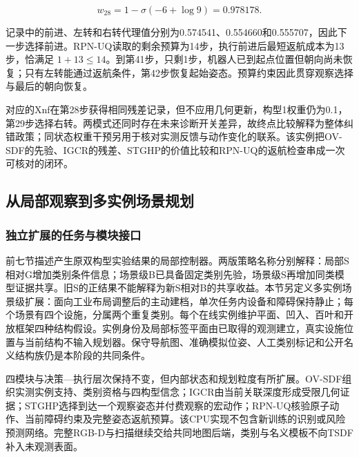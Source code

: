 \documentclass[11pt,a4paper]{article}
\numberwithin{equation}{section}
\begin{document}
\begin{equation}
w_{28}=1-\sigma(-6+\log9)=0.978178.
\end{equation}

记录中的前进、左转和右转代理值分别为0.574541、0.554660和0.555707，因此下一步选择前进。RPN-UQ读取的剩余预算为14步，执行前进后最短返航成本为13步，恰满足 \(1+13\le14\)。到第41步，只剩1步，机器人已到起点位置但朝向尚未恢复；只有左转能通过返航条件，第42步恢复起始姿态。预算约束因此贯穿观察选择与最后的朝向恢复。

对应的Xnf在第28步获得相同残差记录，但不应用几何更新，构型1权重仍为0.1，第29步选择右转。两模式还同时存在未来诊断开关差异，故终点比较解释为整体纠错政策；同状态权重干预另用于核对实测反馈与动作变化的联系。该实例把OV-SDF的先验、IGCR的残差、STGHP的价值比较和RPN-UQ的返航检查串成一次可核对的闭环。

\hypertarget{ux4eceux5c40ux90e8ux89c2ux5bdfux5230ux591aux5b9eux4f8bux573aux666fux89c4ux5212}{%
\subsection{从局部观察到多实例场景规划}\label{ux4eceux5c40ux90e8ux89c2ux5bdfux5230ux591aux5b9eux4f8bux573aux666fux89c4ux5212}}

\hypertarget{ux72ecux7acbux6269ux5c55ux7684ux4efbux52a1ux4e0eux6a21ux5757ux63a5ux53e3}{%
\subsubsection{独立扩展的任务与模块接口}\label{ux72ecux7acbux6269ux5c55ux7684ux4efbux52a1ux4e0eux6a21ux5757ux63a5ux53e3}}

前七节描述产生原双构型实验结果的局部控制器。两版策略名称分别解释：局部S相对G增加类别条件信息；场景级B已具备固定类别先验，场景级S再增加同类模型证据共享。旧S的正结果不能解释为新S相对B的共享收益。本节另定义多实例场景级扩展：面向工业布局调整后的主动建档，单次任务内设备和障碍保持静止；每个场景有四个设施，分属两个重复类别。每个在线实例维护平面、凹入、百叶和开放框架四种结构假设。实例身份及局部标签平面由已取得的观测建立，真实设施位置与当前结构不输入规划器。保守导航图、准确模拟位姿、人工类别标记和公开名义结构族仍是本阶段的共同条件。

四模块与决策---执行层次保持不变，但内部状态和规划粒度有所扩展。OV-SDF组织实测实例支持、类别资格与四构型信念；IGCR由当前关联深度形成受限几何证据；STGHP选择到达一个观察姿态并付费观察的宏动作；RPN-UQ核验原子动作、当前障碍约束及完整姿态返航预算。该CPU实现不包含新训练的识别或风险预测网络。完整RGB-D与扫描继续交给共同地图后端，类别与名义模板不向TSDF补入未观测表面。
\end{document}
